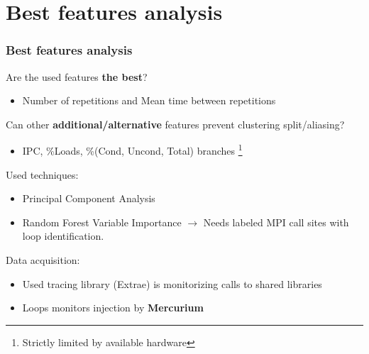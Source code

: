 \documentclass{beamer}
\begin{document}
\section{Best features analysis}

\begin{frame}
\frametitle{Best features analysis}

Are the used features \textbf{the best}?\\
\begin{itemize}
	\item Number of repetitions and Mean time between repetitions
\end{itemize}
\pause
Can other \textbf{additional/alternative} features prevent clustering split/aliasing?\\
\begin{itemize}
	\item IPC, \%Loads, \%(Cond, Uncond, Total) branches \footnote{Strictly limited by available hardware}
\end{itemize}
\pause
Used techniques:\\
\begin{itemize}
	\item Principal Component Analysis
	\item Random Forest Variable Importance $\rightarrow$ Needs labeled MPI call sites with loop identification.
\end{itemize}
\pause
Data acquisition:\\
\begin{itemize}
	\item Used tracing library (Extrae) is monitorizing calls to shared libraries
	\item Loops monitors injection by \textbf{Mercurium}
\end{itemize}
\end{frame}
\end{document}
